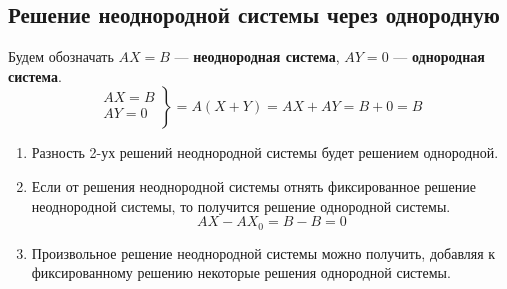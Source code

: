 \documentclass[a4paper, 12pt]{article}
\begin{document}
\subsection*{Решение неоднородной системы через однородную}
Будем обозначать $AX=B$ --- \textbf{неоднородная система}, $AY=0$ --- \textbf{однородная система}.
$$\left.
  \begin{array}{ccc}
    AX=B \\
    AY=0 \\
  \end{array}
\right\}=A(X+Y)=AX+AY=B+0=B$$
\begin{enumerate}
    \item Разность 2-ух решений неоднородной системы будет решением однородной.
    \item Если от решения неоднородной системы отнять фиксированное решение неоднородной системы, то получится решение однородной системы.
    $$AX-AX_0=B-B=0$$
    \item Произвольное решение неоднородной системы можно получить, добавляя к фиксированному решению некоторые решения однородной системы.
\end{enumerate}
\end{document}
